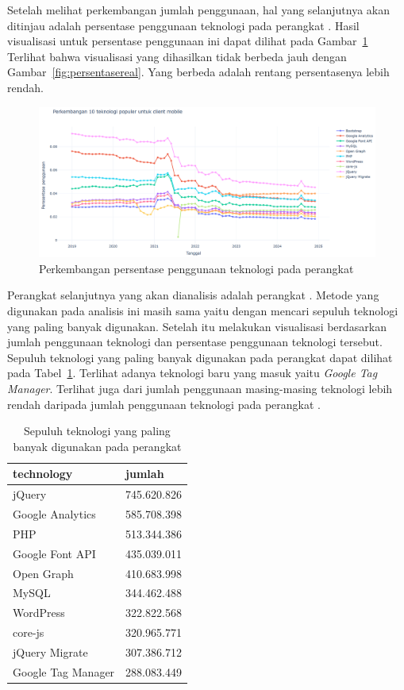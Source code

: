 Setelah melihat perkembangan jumlah penggunaan, hal yang selanjutnya akan ditinjau adalah persentase penggunaan teknologi pada perangkat \mobile. Hasil visualisasi untuk persentase penggunaan ini dapat dilihat pada Gambar~\ref{fig:persentasemobilereal} Terlihat bahwa visualisasi yang dihasilkan tidak berbeda jauh dengan Gambar~\ref{fig:persentasereal}. Yang berbeda adalah rentang persentasenya lebih rendah.

\begin{figure}[H]
    \centering
    \includegraphics[width=0.7\linewidth]{Gambar/persentasemobilereal.png}
    \caption{Perkembangan persentase penggunaan teknologi pada perangkat \mobile}
    \label{fig:persentasemobilereal}
\end{figure}

Perangkat selanjutnya yang akan dianalisis adalah perangkat \desktop. Metode yang digunakan pada analisis ini masih sama yaitu dengan mencari sepuluh teknologi yang paling banyak digunakan.  Setelah itu melakukan visualisasi berdasarkan jumlah penggunaan teknologi dan persentase penggunaan teknologi tersebut. Sepuluh teknologi yang paling banyak digunakan pada perangkat \desktop dapat dilihat pada Tabel~\ref{tab:sepuluhdesktopreal}. Terlihat adanya teknologi baru yang masuk yaitu \textit{Google Tag Manager}. Terlihat juga dari jumlah penggunaan masing-masing teknologi lebih rendah daripada jumlah penggunaan teknologi pada perangkat \mobile. 

\begin{table}[H]
\centering
\caption{Sepuluh teknologi yang paling banyak digunakan pada perangkat \desktop}
\label{tab:sepuluhdesktopreal}
\begin{tabular}{|l|l|}
\hline
technology & jumlah \\ \hline
jQuery & 745.620.826 \\ \hline
Google Analytics & 585.708.398 \\ \hline
PHP & 513.344.386 \\ \hline
Google Font API & 435.039.011 \\ \hline
Open Graph & 410.683.998 \\ \hline
MySQL & 344.462.488 \\ \hline
WordPress & 322.822.568 \\ \hline
core-js & 320.965.771 \\ \hline
jQuery Migrate & 307.386.712 \\ \hline
Google Tag Manager & 288.083.449 \\ \hline
\end{tabular}
\end{table}

